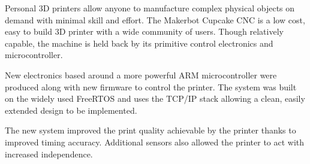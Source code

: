 Personal 3D printers allow anyone to manufacture complex physical objects on
demand with minimal skill and effort. The Makerbot Cupcake CNC is a low cost,
easy to build 3D printer with a wide community of users. Though relatively
capable, the machine is held back by its primitive control electronics and
microcontroller.

New electronics based around a more powerful ARM microcontroller were produced
along with new firmware to control the printer. The system was built on the
widely used FreeRTOS and uses the \uIP{} TCP/IP stack allowing a clean, easily
extended design to be implemented.

The new system improved the print quality achievable by the printer thanks to
improved timing accuracy. Additional sensors also allowed the printer to act
with increased independence.
